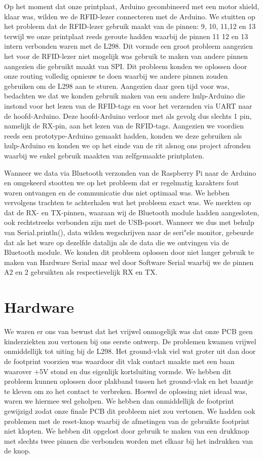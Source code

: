 Op het moment dat onze printplaat, Arduino gecombineerd met een motor shield, klaar was, wilden we de RFID-lezer connecteren met de Arduino. We stuitten op het probleem dat de RFID-lezer gebruik maakt van de pinnen: 9, 10, 11,12 en 13 terwijl we onze printplaat reeds geroute hadden waarbij de pinnen 11 12 en 13 intern verbonden waren met de L298. Dit vormde een groot probleem aangezien het voor de RFID-lezer niet mogelijk was gebruik te maken van andere pinnen aangezien die gebruikt maakt van SPI. Dit probleem konden we oplossen door onze routing volledig opnieuw te doen waarbij we andere pinnen zouden gebruiken om de L298 aan te sturen. Aangezien daar geen tijd voor was, bedachten we dat we konden gebruik maken van een andere hulp-Arduino die instond voor het lezen van de RFID-tags en voor het verzenden via UART naar de hoofd-Arduino. Deze hoofd-Arduino verloor met als gevolg dus slechts 1 pin, namelijk de RX-pin, aan het lezen van de RFID-tags. Aangezien we voordien reeds een prototype-Arduino gemaakt hadden, konden we deze gebruiken als hulp-Arduino en konden we op het einde van de rit alsnog ons project afronden waarbij we enkel gebruik maakten van zelfgemaakte printplaten.

Wanneer we data via Bluetooth verzonden van de Raspberry Pi naar de Arduino en omgekeerd stootten we op het probleem dat er regelmatig karakters fout waren ontvangen en de communicatie dus niet optimaal was. We hebben vervolgens trachten te achterhalen wat het probleem exact was. We merkten op dat de RX- en TX-pinnen, waaraan wij de Bluetooth module hadden aangesloten, ook rechtstreeks verbonden zijn met de USB-poort. Wanneer we dus met behulp van Serial.println(), data wilden wegschrijven naar de seri"ele monitor, gebeurde dat als het ware op dezelfde datalijn als de data die we ontvingen via de Bluetooth module. We konden dit probleem oplossen door niet langer gebruik te maken van Hardware Serial maar wel door Software Serial waarbij we de pinnen A2 en 2 gebruikten als respectievelijk RX en TX.

\section{Hardware}
We waren er ons van bewust dat het vrijwel onmogelijk was dat onze PCB geen kinderziekten zou vertonen bij ons eerste ontwerp. De problemen kwamen vrijwel onmiddellijk tot uiting bij de L298. Het ground-vlak viel wat groter uit dan door de footprint voorzien was waardoor dit vlak contact maakte met een baan waarover +5V stond en dus eigenlijk kortsluiting vormde. We hebben dit probleem kunnen oplossen door plakband tussen het ground-vlak en het baantje te kleven om zo het contact te verbreken. Hoewel de oplossing niet ideaal was, waren we hiermee wel geholpen. We hebben dan onmiddellijk de footprint gewijzigd zodat onze finale PCB dit probleem niet zou vertonen. We hadden ook problemen met de reset-knop waarbij de afmetingen van de gebruikte footprint niet klopten. We hebben dit opgelost door gebruik te maken van een drukknop met slechts twee pinnen die verbonden worden met elkaar bij het indrukken van de knop. 

